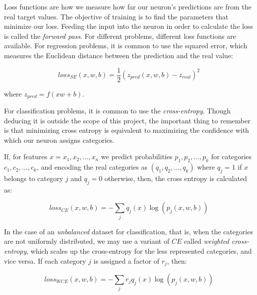 




\label{02_nn_loss_functions}

Loss functions are how we measure how far our neuron's predictions are from the real target values. The objective of training is to find the parameters that minimize our loss. Feeding the input into the neuron in order to calculate the loss is called the \emph{forward pass}.
For different problems, different loss functions are available. For regression problems, it is common to use the squared error, which measures the Euclidean distance between the prediction and the real value:

\begin{equation}
    loss_{SE}(x,w,b) =  \dfrac{1}{2} (z_{pred}(x,w,b)-z_{real})^2
\end{equation}

where $z_{pred} = f(xw+b)$.

For classification problems, it is common to use the \emph{cross-entropy}. Though deducing it is outside the scope of this project, the important thing to remember is that minimizing cross entropy is equivalent to maximizing the confidence with which our neuron assigns categories.

If, for features $x = x_1, x_2, \ldots, x_n$ we predict probabilities $p_1, p_2, \ldots, p_k$ for categories $c_1, c_2, \ldots, c_k$, and encoding the real categories as $(q_1, q_2, \ldots, q_k)$ where $q_j =1 $ if $x$ belongs to category $j$ and $q_j = 0$ otherwise, then, the cross entropy is calculated as:

\begin{equation}
    loss_{CE}(x,w,b) =  - \sum_{j} q_{j}(x) \log{(p_{j}(x,w,b))}
\end{equation}

In the case of an \emph{unbalanced} dataset for classification, that is, when the categories are not uniformly distributed, we may use a variant of $CE$ called \emph{weighted cross-entropy}, which scales up the cross-entropy for the less represented categories, and vice versa. If each category $j$ is assigned a factor of $r_j$, then:

\begin{equation}
    loss_{WCE}(x,w,b) =  - \sum_{j} r_j q_{j}(x) \log{(p_{j}(x,w,b))}
\end{equation}


